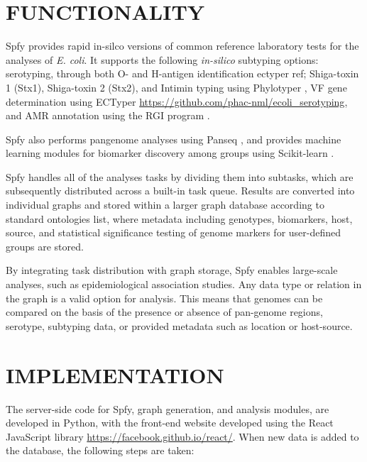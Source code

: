\documentclass{article}
\begin{document}
\section{FUNCTIONALITY}

Spfy provides rapid in-silco versions of common reference laboratory tests for the analyses of \textit{E. coli}. It supports the following \textit{in-silico} subtyping options: serotyping, through both O- and H-antigen identification {ectyper ref}; Shiga-toxin 1 (Stx1), Shiga-toxin 2 (Stx2), and Intimin typing using Phylotyper \cite{whiteside2017phylotyper}, VF gene determination using ECTyper \url{https://github.com/phac-nml/ecoli\_serotyping}, and AMR annotation using the RGI program \cite{mcarthur2013comprehensive}.

Spfy also performs pangenome analyses using Panseq \cite{laing2010pan}, and provides machine learning modules for biomarker discovery among groups using Scikit-learn \cite{pedregosa2011scikit}.

Spfy handles all of the analyses tasks by dividing them into subtasks, which are subsequently distributed across a built-in task queue. Results are converted into individual graphs and stored within a larger graph database according to standard ontologies {list}, where metadata including genotypes, biomarkers, host, source, and statistical significance testing of genome markers for user-defined groups are stored.

By integrating task distribution with graph storage, Spfy enables large-scale analyses, such as epidemiological association studies. Any data type or relation in the graph is a valid option for analysis. This means that genomes can be compared on the basis of the presence or absence of pan-genome regions, serotype, subtyping data, or provided metadata such as location or host-source.


\section{IMPLEMENTATION}
The server-side code for Spfy, graph generation, and analysis modules, are developed in Python, with the front-end website developed using the React JavaScript library \url{https://facebook.github.io/react/}. When new data is added to the database, the following steps are taken:
\end{document}
